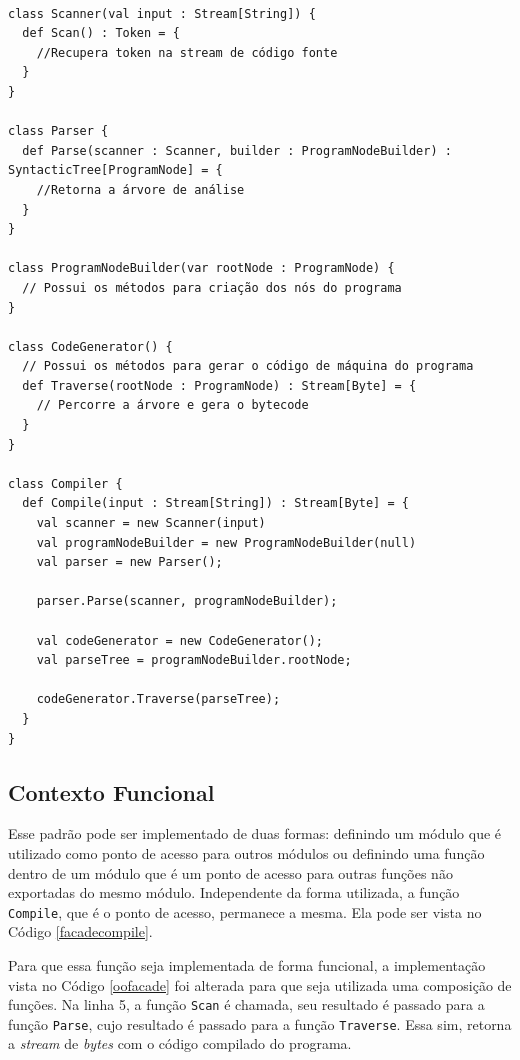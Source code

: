 \begin{lstlisting}[caption={\textit{Façade} Orientado a Objetos.},label=oofacade]

class Scanner(val input : Stream[String]) {
  def Scan() : Token = {
    //Recupera token na stream de código fonte
  }
}

class Parser {
  def Parse(scanner : Scanner, builder : ProgramNodeBuilder) : SyntacticTree[ProgramNode] = {
    //Retorna a árvore de análise
  }
}

class ProgramNodeBuilder(var rootNode : ProgramNode) {
  // Possui os métodos para criação dos nós do programa
}

class CodeGenerator() {
  // Possui os métodos para gerar o código de máquina do programa
  def Traverse(rootNode : ProgramNode) : Stream[Byte] = {
    // Percorre a árvore e gera o bytecode
  }
}

class Compiler {
  def Compile(input : Stream[String]) : Stream[Byte] = {
    val scanner = new Scanner(input)
    val programNodeBuilder = new ProgramNodeBuilder(null)
    val parser = new Parser();

    parser.Parse(scanner, programNodeBuilder);

    val codeGenerator = new CodeGenerator();
    val parseTree = programNodeBuilder.rootNode;

    codeGenerator.Traverse(parseTree);
  }
}

\end{lstlisting}

\subsection*{Contexto Funcional}

Esse padrão pode ser implementado de duas formas: 
definindo um módulo que é utilizado como ponto de 
acesso para outros módulos ou definindo uma 
função dentro de um módulo que é um ponto de 
acesso para outras funções não exportadas do 
mesmo módulo. Independente da forma utilizada, 
a função \texttt{Compile}, que é o ponto de acesso, permanece 
a mesma. Ela pode ser vista no Código \ref{facadecompile}. 

Para que essa função seja implementada de forma 
funcional, a implementação vista no Código \ref{oofacade} 
foi alterada para que seja utilizada uma composição 
de funções. Na linha 5, a função \texttt{Scan} é chamada, 
seu resultado é passado para a função \texttt{Parse}, cujo 
resultado é passado para a função \texttt{Traverse}. Essa sim, 
retorna a \textit{stream} de \textit{bytes} com o 
código compilado do programa.

